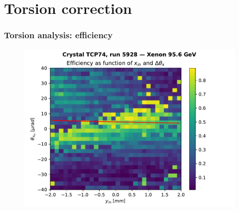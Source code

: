 \documentclass[10pt]{beamer}
\begin{document}
\section{Torsion correction}



\begin{frame}
\frametitle{Torsion analysis: efficiency}

\begin{figure}
\includegraphics[width=0.8\linewidth]{efficiency_histo.pdf}\\
\end{figure}

\end{frame}




% 
% 
\end{document}
